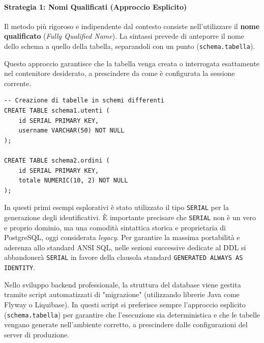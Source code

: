 \paragraph{Strategia 1: Nomi Qualificati (Approccio Esplicito)}

Il metodo più rigoroso e indipendente dal contesto consiste nell'utilizzare il \textbf{nome qualificato} (\textit{Fully Qualified Name}). La sintassi prevede di anteporre il nome dello schema a quello della tabella, separandoli con un punto (\texttt{schema.tabella}). 

Questo approccio garantisce che la tabella venga creata o interrogata esattamente nel contenitore desiderato, a prescindere da come è configurata la sessione corrente.

\begin{lstlisting}[language=PostgreSQL, title=Creazione tabelle con Nomi Qualificati]
-- Creazione di tabelle in schemi differenti
CREATE TABLE schema1.utenti (
    id SERIAL PRIMARY KEY,
    username VARCHAR(50) NOT NULL
);

CREATE TABLE schema2.ordini (
    id SERIAL PRIMARY KEY,
    totale NUMERIC(10, 2) NOT NULL
);
\end{lstlisting}

\begin{warningbox}
In questi primi esempi esplorativi è stato utilizzato il tipo \texttt{SERIAL} per la generazione degli identificativi. È importante precisare che \texttt{SERIAL} non è un vero e proprio dominio, ma una comodità sintattica storica e proprietaria di PostgreSQL, oggi considerata \textit{legacy}. Per garantire la massima portabilità e aderenza allo standard ANSI SQL, nelle sezioni successive dedicate al DDL si abbandonerà \texttt{SERIAL} in favore della clausola standard \texttt{GENERATED ALWAYS AS IDENTITY}.
\end{warningbox}

\begin{bestpractice}
Nello sviluppo backend professionale, la struttura del database viene gestita tramite script automatizzati di "migrazione" (utilizzando librerie Java come Flyway o Liquibase). In questi script si preferisce sempre l'approccio esplicito (\texttt{schema.tabella}) per garantire che l'esecuzione sia deterministica e che le tabelle vengano generate nell'ambiente corretto, a prescindere dalle configurazioni del server di produzione.
\end{bestpractice}

